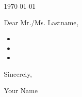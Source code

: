 \documentclass[10pt, a4paper]{article}
\begin{document}
\makeprofile %

\makecontact %

\today %

\makeemployerinfo %

Dear Mr./Ms. Lastname,

\lipsum[3][7-10] %

\begin{itemize}
    \item \lipsum*[1][7-8]
    \item \lipsum*[6][7-10]
    \item \lipsum*[5][7-9]
\end{itemize}

\lipsum[12-13]

Sincerely,

Your Name
\end{document}

